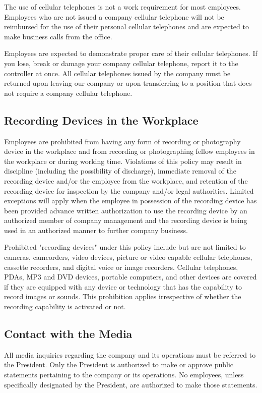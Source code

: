 \documentclass{book}
\begin{document}
The use of cellular telephones is not a work requirement for most employees. Employees who are not issued a company cellular telephone will not be reimbursed for the use of their personal cellular telephones and are expected to make business calls from the office.

Employees are expected to demonstrate proper care of their cellular telephones. If you lose, break or damage your company cellular telephone, report it to the controller at once. All cellular telephones issued by the company must be returned upon leaving our company or upon transferring to a position that does not require a company cellular telephone.

\subsection{Recording Devices in the Workplace}

Employees are prohibited from having any form of recording or photography device in the workplace and from recording or photographing fellow employees in the workplace or during working time. Violations of this policy may result in discipline (including the possibility of discharge), immediate removal of the recording device and/or the employee from the workplace, and retention of the recording device for inspection by the company and/or legal authorities. Limited exceptions will apply when the employee in possession of the recording device has been provided advance written authorization to use the recording device by an authorized member of company management and the recording device is being used in an authorized manner to further company business.

Prohibited "recording devices" under this policy include but are not limited to cameras, camcorders, video devices, picture or video capable cellular telephones, cassette recorders, and digital voice or image recorders. Cellular telephones, PDAs, MP3 and DVD devices, portable computers, and other devices are covered if they are equipped with any device or technology that has the capability to record images or sounds. This prohibition applies irrespective of whether the recording capability is activated or not.

\subsection{Contact with the Media}

All media inquiries regarding the company and its operations must be referred to the President. Only the President is authorized to make or approve public statements pertaining to the company or its operations. No employees, unless specifically designated by the President, are authorized to make those statements.
\end{document}
